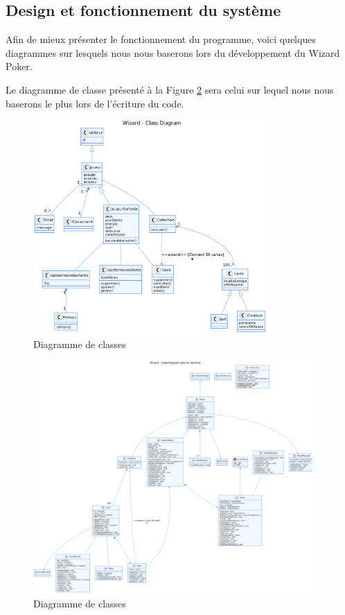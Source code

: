 \documentclass[11pt,a4paper]{article}
\begin{document}
\subsection{Design et fonctionnement du système}
\label{sec:design}

Afin de mieux présenter le fonctionnement du programme, voici quelques
diagrammes sur lesquels nous nous baserons lors du
développement du Wizard Poker.

\medbreak

Le diagramme de classe présenté à la Figure \ref{fig:class} sera celui sur lequel nous nous baserons le plus lors de l'écriture du code.

\begin{figure}
  \centering
  \includegraphics[width=0.8\textwidth]{assets/uml/ClassDiagram1.png}
  \caption{\label{fig:class} Diagramme de classes}
\end{figure}

\begin{figure}
  \centering
  \includegraphics[width=0.95\textwidth]{assets/uml/ClassDiagram2.png}
  \caption{\label{fig:class} Diagramme de classes}
\end{figure}
\end{document}
